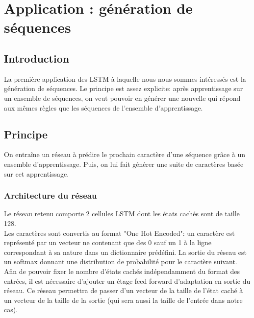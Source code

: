 \chapter{Application : génération de séquences}

\label{chapter7}

\section{Introduction}

La première application des LSTM à laquelle nous nous sommes intéressés est la génération de séquences. Le principe est assez explicite: après apprentissage sur un ensemble de séquences, on veut pouvoir en générer une nouvelle qui répond aux mêmes règles que les séquences de l'ensemble d'apprentissage.
 

\section{Principe}
On entraîne un réseau à prédire le prochain caractère d'une séquence grâce à un ensemble d'apprentissage. Puis, on lui fait générer une suite de caractères basée sur cet apprentissage.

\subsection{Architecture du réseau}

Le réseau retenu comporte 2 cellules LSTM dont les états cachés sont de taille 128.
\\ Les caractères sont convertis au format "One Hot Encoded": un caractère est représenté par un vecteur ne contenant que des 0 sauf un 1 à la ligne correspondant à sa nature dans un dictionnaire prédéfini. La sortie du réseau est un softmax donnant une distribution de probabilité pour le caractère suivant.
\\ Afin de pouvoir fixer le nombre d'états cachés indépendamment du format des entrées, il est nécessaire d'ajouter un étage feed forward d'adaptation en sortie du réseau. Ce réseau permettra de passer d'un vecteur de la taille de l'état caché à un vecteur de la taille de la sortie (qui sera aussi la taille de l'entrée dans notre cas).

